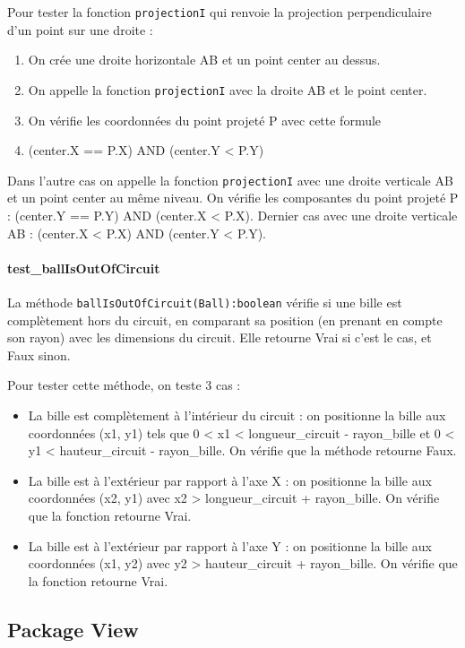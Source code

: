 \documentclass{report}
\begin{document}
Pour tester la fonction \texttt{projectionI} qui renvoie la projection perpendiculaire d’un point sur une droite :

\begin{enumerate}
\item On crée une droite horizontale AB et un point center au dessus.
\item On appelle la fonction \texttt{projectionI} avec la droite AB et le point center.
\item On vérifie les coordonnées du point projeté P avec cette formule 
\item (center.X  == P.X) AND (center.Y < P.Y)
\end{enumerate}

Dans l’autre cas on appelle la fonction \texttt{projectionI} avec une droite verticale AB et un point center au même niveau. On vérifie les composantes du point projeté P : (center.Y == P.Y) AND (center.X < P.X).
Dernier cas avec une droite verticale AB : (center.X < P.X) AND (center.Y < P.Y). 

\paragraph{test\_ballIsOutOfCircuit}

La méthode \texttt{ballIsOutOfCircuit(Ball):boolean} vérifie si une bille est complètement hors du circuit, en comparant sa position (en prenant en compte son rayon) avec les dimensions du circuit. Elle retourne Vrai si c’est le cas, et Faux sinon.

Pour tester cette méthode, on teste 3 cas :

\begin{itemize}
\item La bille est complètement à l’intérieur du circuit : on positionne la bille aux coordonnées (x1, y1) tels que 0 < x1 < longueur\_circuit - rayon\_bille et 0 < y1 < hauteur\_circuit - rayon\_bille. On vérifie que la méthode retourne Faux.
\item La bille est à l’extérieur par rapport à l’axe X : on positionne la bille aux coordonnées (x2, y1) avec x2 > longueur\_circuit + rayon\_bille. On vérifie que la fonction retourne Vrai.
\item La bille est à l’extérieur par rapport à l’axe Y : on positionne la bille aux coordonnées (x1, y2) avec y2 > hauteur\_circuit + rayon\_bille. On vérifie que la fonction retourne Vrai.
\end{itemize}

\subsection{Package View}
\end{document}
